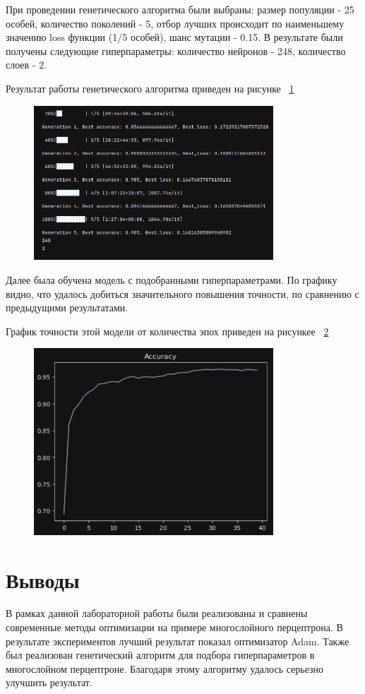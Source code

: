 \documentclass[a4paper, 14pt]{extarticle}
\begin{document}
При проведении генетического алгоритма были выбраны: размер популяции - 25 особей, количество поколений - 5, отбор лучших происходит по наименьшему значению loss функции (1/5 особей), шанс мутации - 0.15. В результате были получены следующие гиперпараметры: количество нейронов - 248, количество слоев - 2.

Результат работы генетического алгоритма приведен на рисунке ~\ref{fig:img5}

\begin{figure}[H]
\centering
\includegraphics[width=0.8\textwidth]{images/res5.png}
\caption{}
\label{fig:img5}
\end{figure}


Далее была обучена модель с подобранными гиперпараметрами. По графику видно, что удалось добиться значительного повышения точности, по сравнению с предыдущими результатами.

График точности этой модели от количества эпох приведен на рисункее ~\ref{fig:img6}

\begin{figure}[H]
\centering
\includegraphics[width=0.8\textwidth]{images/res6.png}
\caption{}
\label{fig:img6}
\end{figure}


\section{Выводы}
В рамках данной лабораторной работы были реализованы и сравнены современные методы оптимизации на примере многослойного перцептрона. В результате экспериментов лучший результат показал оптимизатор Adam. Также был реализован генетический алгоритм для подбора гиперпараметров в многослойном перцептроне. Благодаря этому алгоритму удалось серьезно улучшить результат.
\end{document}
